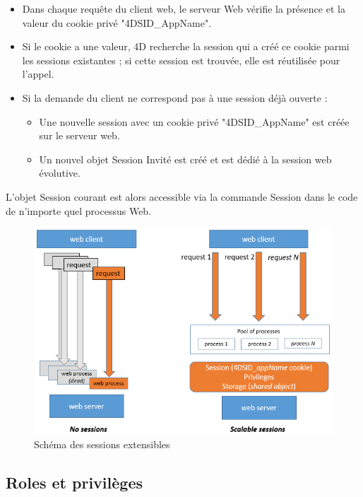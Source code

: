 \begin{itemize}[label=$\checkmark$]
    \item Dans chaque requête du client web, le serveur Web vérifie la présence et la valeur du cookie privé "4DSID\_AppName".
    \item Si le cookie a une valeur, 4D recherche la session qui a créé ce cookie parmi les sessions existantes ; si cette session est trouvée, elle est réutilisée pour l'appel.
    \item Si la demande du client ne correspond pas à une session déjà ouverte :
    \begin{itemize}[label=$\bullet$]
        \item Une nouvelle session avec un cookie privé "4DSID\_AppName" est créée sur le serveur web.
        \item Un nouvel objet Session Invité est créé et est dédié à la session web évolutive.
    \end{itemize}
\end{itemize}

L'objet Session courant est alors accessible via la commande Session dans le code de n'importe quel processus Web.


\begin{figure}[H]
    \centering
    \includegraphics[width=19cm]{Figures/session.png}
    \caption{Schéma des sessions extensibles}
\end{figure}

\subsection{Roles et privilèges }

